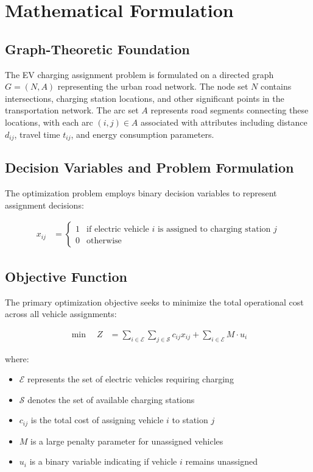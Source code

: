 \documentclass[12pt,a4paper]{article}
\begin{document}
\section{Mathematical Formulation}

\subsection{Graph-Theoretic Foundation}

The EV charging assignment problem is formulated on a directed graph $G = (N, A)$ representing the urban road network. The node set $N$ contains intersections, charging station locations, and other significant points in the transportation network. The arc set $A$ represents road segments connecting these locations, with each arc $(i,j) \in A$ associated with attributes including distance $d_{ij}$, travel time $t_{ij}$, and energy consumption parameters.

\subsection{Decision Variables and Problem Formulation}

The optimization problem employs binary decision variables to represent assignment decisions:

\begin{align}
x_{ij} &= \begin{cases}
1 & \text{if electric vehicle } i \text{ is assigned to charging station } j \\
0 & \text{otherwise}
\end{cases}
\end{align}

\subsection{Objective Function}

The primary optimization objective seeks to minimize the total operational cost across all vehicle assignments:

\begin{align}
\min \quad Z &= \sum_{i \in \mathcal{E}} \sum_{j \in \mathcal{S}} c_{ij} x_{ij} + \sum_{i \in \mathcal{E}} M \cdot u_i
\end{align}

where:
\begin{itemize}
\item $\mathcal{E}$ represents the set of electric vehicles requiring charging
\item $\mathcal{S}$ denotes the set of available charging stations
\item $c_{ij}$ is the total cost of assigning vehicle $i$ to station $j$
\item $M$ is a large penalty parameter for unassigned vehicles
\item $u_i$ is a binary variable indicating if vehicle $i$ remains unassigned
\end{itemize}
\end{document}
